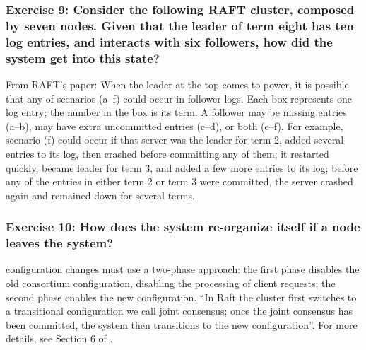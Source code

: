 \documentclass[12pt,a4paper]{article}
\begin{document}
 \subsubsection*{Exercise 9: Consider the following RAFT cluster, composed by seven nodes. Given that the leader of term eight has ten log entries, and interacts with six followers, how did the system get into this state?}
 
  From RAFT's paper: When the leader at the top comes to power, it is
possible that any of scenarios (a–f) could occur in follower
logs. Each box represents one log entry; the number in the
box is its term. A follower may be missing entries (a–b), may
have extra uncommitted entries (c–d), or both (e–f). For example, scenario (f) could occur if that server was the leader
for term 2, added several entries to its log, then crashed before
committing any of them; it restarted quickly, became leader
for term 3, and added a few more entries to its log; before any
of the entries in either term 2 or term 3 were committed, the
server crashed again and remained down for several terms.

\subsubsection*{Exercise 10: How does the system re-organize itself if a node leaves the system?}

configuration changes must
use a two-phase approach: the first phase disables the old consortium configuration, disabling the processing of client requests; the second phase enables the new configuration. ``In Raft the cluster first switches to a transitional configuration we call joint
consensus; once the joint consensus has been committed, the system then transitions to the new configuration''. 
For more details, see Section 6 of \cite{raft_paper}.


\end{document}
